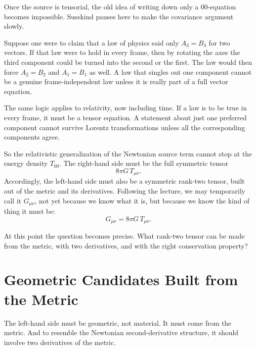 Once the source is tensorial, the old idea of writing down only a \(00\)-equation becomes impossible. Susskind pauses here to make the covariance argument slowly.

Suppose one were to claim that a law of physics said only \(A_3=B_3\) for two vectors. If that law were to hold in every frame, then by rotating the axes the third component could be turned into the second or the first. The law would then force \(A_2=B_2\) and \(A_1=B_1\) as well. A law that singles out one component cannot be a genuine frame-independent law unless it is really part of a full vector equation.

The same logic applies to relativity, now including time. If a law is to be true in every frame, it must be a tensor equation. A statement about just one preferred component cannot survive Lorentz transformations unless all the corresponding components agree.

So the relativistic generalization of the Newtonian source term cannot stop at the energy density \(T_{00}\). The right-hand side must be the full symmetric tensor
\begin{equation}
8\pi G\,T_{\mu\nu}.
\end{equation}
Accordingly, the left-hand side must also be a symmetric rank-two tensor, built out of the metric and its derivatives. Following the lecture, we may temporarily call it \(G_{\mu\nu}\), not yet because we know what it is, but because we know the kind of thing it must be:
\begin{equation}
G_{\mu\nu}=8\pi G\,T_{\mu\nu}.
\end{equation}

At this point the question becomes precise. What rank-two tensor can be made from the metric, with two derivatives, and with the right conservation property?

\section{Geometric Candidates Built from the Metric}

The left-hand side must be geometric, not material. It must come from the metric. And to resemble the Newtonian second-derivative structure, it should involve two derivatives of the metric.

